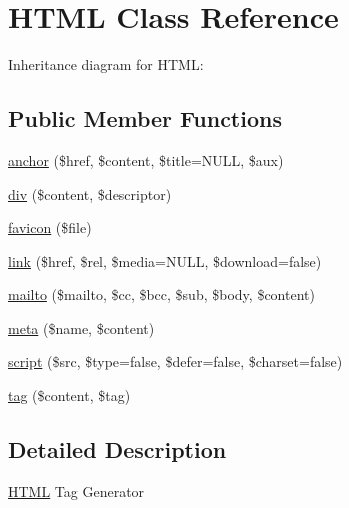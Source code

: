 \hypertarget{class_w_a_f_f_l_e_1_1_framework_1_1_engines_1_1_h_t_m_l}{}\section{H\+T\+ML Class Reference}
\label{class_w_a_f_f_l_e_1_1_framework_1_1_engines_1_1_h_t_m_l}


Inheritance diagram for H\+T\+ML\+:
\subsection*{Public Member Functions}
\begin{DoxyCompactItemize}
\item 
\hyperlink{class_w_a_f_f_l_e_1_1_framework_1_1_engines_1_1_h_t_m_l_a3c534563b3b17abd31c70ce81c518a6d}{anchor} (\$href, \$content, \$title=N\+U\+LL, \$aux)
\item 
\hyperlink{class_w_a_f_f_l_e_1_1_framework_1_1_engines_1_1_h_t_m_l_a12602b493053197597cfcaffa61a6e14}{div} (\$content, \$descriptor)
\item 
\hyperlink{class_w_a_f_f_l_e_1_1_framework_1_1_engines_1_1_h_t_m_l_a3f5f65b7897f31a9a6eae79588a9e6c5}{favicon} (\$file)
\item 
\hyperlink{class_w_a_f_f_l_e_1_1_framework_1_1_engines_1_1_h_t_m_l_a7596de1be94a6dc237fa4d435193da8b}{link} (\$href, \$rel, \$media=N\+U\+LL, \$download=false)
\item 
\hyperlink{class_w_a_f_f_l_e_1_1_framework_1_1_engines_1_1_h_t_m_l_a77b7fda51b7845d6a6c738efc5d248ff}{mailto} (\$mailto, \$cc, \$bcc, \$sub, \$body, \$content)
\item 
\hyperlink{class_w_a_f_f_l_e_1_1_framework_1_1_engines_1_1_h_t_m_l_af2959b14380c3635ed932a5d1b877bd8}{meta} (\$name, \$content)
\item 
\hyperlink{class_w_a_f_f_l_e_1_1_framework_1_1_engines_1_1_h_t_m_l_a9a92856db6ac937a9dace60224dfaf65}{script} (\$src, \$type=false, \$defer=false, \$charset=false)
\item 
\hyperlink{class_w_a_f_f_l_e_1_1_framework_1_1_engines_1_1_h_t_m_l_a61aeb234b0eb5d6895f91ba5b533bfce}{tag} (\$content, \$tag)
\end{DoxyCompactItemize}


\subsection{Detailed Description}
\hyperlink{class_w_a_f_f_l_e_1_1_framework_1_1_engines_1_1_h_t_m_l}{H\+T\+ML} Tag Generator

